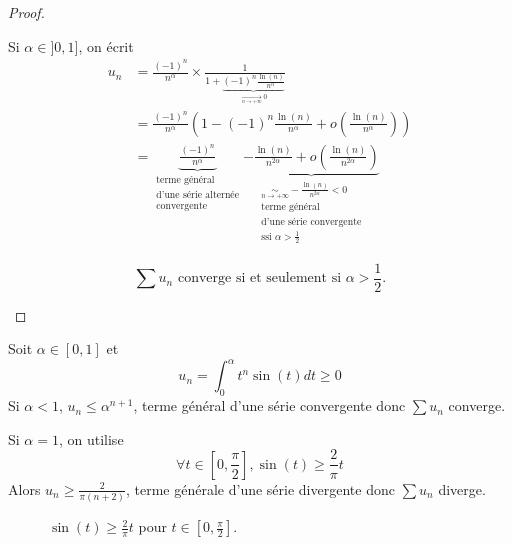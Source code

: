 \begin{proof}
\begin{enumerate}
		Si $\alpha\in]0,1]$, on écrit 
		\begin{align*}
			u_{n}
			&=\frac{(-1)^{n}}{n^{\alpha}}\times\frac{1}{1+\underbrace{(-1)^{n}\frac{\ln(n)}{n^{\alpha}}}_{\xrightarrow[n\to+\infty]{}0}}\\
			&=\frac{(-1)^{n}}{n^{\alpha}}\left(1-(-1)^{n}\frac{\ln(n)}{n^{\alpha}}+o\left(\frac{\ln(n)}{n^{\alpha}}\right)\right)\\
			&=\underbrace{\frac{(-1)^{n}}{n^{\alpha}}}_{\substack{\text{terme général}\\\text{d'une série alternée}\\\text{convergente}}}\underbrace{-\frac{\ln(n)}{n^{2\alpha}}+o\left(\frac{\ln(n)}{n^{2\alpha}}\right)}_{\substack{\underset{n\to+\infty}{\sim}-\frac{\ln(n)}{n^{2\alpha}}<0\\\text{terme général}\\\text{d'une série convergente}\\\text{ssi }\alpha>\frac{1}{2}}}
		\end{align*}

		$$\boxed{\sum u_{n}\text{ converge si et seulement si }\alpha>\frac{1}{2}\text{.}}$$
	\end{enumerate}
\end{proof}

\begin{remark}
	Soit $\alpha\in[0,1]$ et 
	$$u_{n}=\int_{0}^{\alpha}t^{n}\sin(t)dt\geqslant0$$
	Si $\alpha<1$, $u_{n}\leqslant\alpha^{n+1}$, terme général d'une série convergente donc $\sum u_{n}$ converge.

	Si $\alpha=1$, on utilise
	$$\forall t\in\left[0,\frac{\pi}{2}\right],\sin(t)\geqslant\frac{2}{\pi}t$$
	Alors $u_{n}\geqslant\frac{2}{\pi (n+2)}$, terme générale d'une série divergente donc $\sum u_{n}$ diverge.
\end{remark}

\begin{figure}[ht!]
	\centering
	\caption{$\sin(t)\geqslant\frac{2}{\pi}t$ pour $t\in\left[0,\frac{\pi}{2}\right]$.}
\end{figure}

